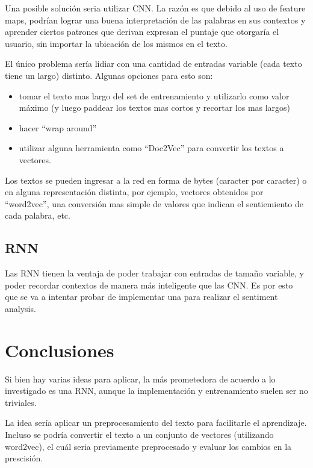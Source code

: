 Una posible soluci\'on seria utilizar CNN. La raz\'on es que debido al uso de feature maps, podr\'ian
lograr una buena interpretaci\'on de las palabras en sus contextos y aprender ciertos patrones que
derivan expresan el puntaje que otorgar\'ia el usuario, sin importar la ubicaci\'on de los mismos
en el texto.

El \'unico problema ser\'ia lidiar con una cantidad de entradas variable (cada texto tiene un largo)
distinto. Algunas opciones para esto son:

\begin{itemize}
\setlength\itemsep{0em}
   \item tomar el texto mas largo del set de entrenamiento y utilizarlo como valor m\'aximo (y luego
         paddear los textos mas cortos y recortar los mas largos)
   \item hacer ``wrap around''
   \item utilizar alguna herramienta como ``Doc2Vec'' para convertir los textos a vectores. \cite{doc2vec}
\end{itemize}

Los textos se pueden ingresar a la red en forma de bytes (caracter por caracter) o en alguna
representaci\'on distinta, por ejemplo, vectores obtenidos por ``word2vec'', una conversi\'on mas
simple de valores que indican el sentiemiento de cada palabra, etc. \cite{CNN_for_nlp}


\subsection{RNN}

Las RNN tienen la ventaja de poder trabajar con entradas de tama\~no variable, y poder recordar
contextos de manera m\'as inteligente que las CNN. Es por esto que se va a intentar probar de
implementar una para realizar el sentiment analysis. \cite{LSTM_sentiment_analysis}


\section{Conclusiones}

Si bien hay varias ideas para aplicar, la más prometedora de acuerdo a lo investigado es una RNN,
aunque la implementación y entrenamiento suelen ser no triviales.

La idea sería aplicar un preprocesamiento del texto para facilitarle el aprendizaje.
Incluso se podría convertir el texto a un conjunto de vectores (utilizando word2vec), el cuál seria
previamente preprocesado y evaluar los cambios en la prescisión.

